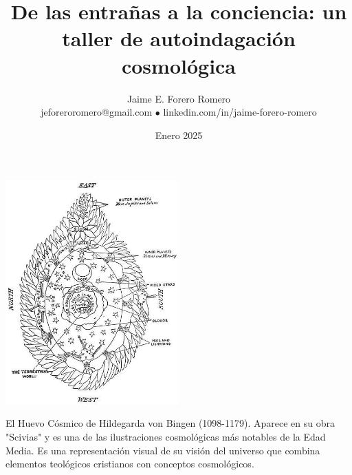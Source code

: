 \documentclass[statementpaper,oneside,article,10pt]{memoir}
\newcommand{\BackgroundPic}[1]{%
\put(0,0){%
\parbox[b][\paperheight]{\paperwidth}{%
\vfill
\centering
{\transparent{0.4} \texttt{[image: \#1]}}%
\vfill
}}}
\begin{document}

\title{De las entrañas a la conciencia: un taller de autoindagación cosmológica}
\author{Jaime E. Forero Romero\\
\tiny{jeforeroromero@gmail.com $\bullet$ linkedin.com/in/jaime-forero-romero}}
\date{Enero 2025}
\begingroup
\let\cleardoublepage\clearpage


\begin{titlingpage}
\maketitle


\begin{center}
\includegraphics[width=0.5\textwidth]{universe-egg.jpg}
\end{center}
\begin{center}
\begin{minipage}{0.7\textwidth}
\tiny\centering
El Huevo Cósmico de Hildegarda von Bingen (1098-1179). Aparece en su obra "Scivias" y es una de las ilustraciones cosmológicas más notables de la Edad Media. Es una representación visual de su visión del universo que combina elementos teológicos cristianos con conceptos cosmológicos.
\end{minipage}
\end{center}


\end{titlingpage}

\endgroup

\pagestyle{empty}
\end{document}

